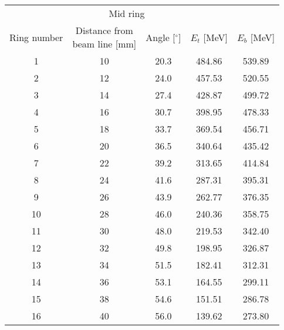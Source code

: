 \begin{tabular}{ccccc}
\hline
            & \multicolumn{2}{c}{Mid ring}                                     &             &             \\
Ring number & \shortstack{Distance from \\ beam line [mm]}  & Angle [$^\circ$] & $E_t$ [MeV] & $E_b$ [MeV] \\
\hline
1           & 10                                            & 20.3             & 484.86      & 539.89      \\
2           & 12                                            & 24.0             & 457.53      & 520.55      \\
3           & 14                                            & 27.4             & 428.87      & 499.72      \\
4           & 16                                            & 30.7             & 398.95      & 478.33      \\
5           & 18                                            & 33.7             & 369.54      & 456.71      \\
6           & 20                                            & 36.5             & 340.64      & 435.42      \\
7           & 22                                            & 39.2             & 313.65      & 414.84      \\
8           & 24                                            & 41.6             & 287.31      & 395.31      \\
9           & 26                                            & 43.9             & 262.77      & 376.35      \\
10          & 28                                            & 46.0             & 240.36      & 358.75      \\
11          & 30                                            & 48.0             & 219.53      & 342.40      \\
12          & 32                                            & 49.8             & 198.95      & 326.87      \\
13          & 34                                            & 51.5             & 182.41      & 312.31      \\
14          & 36                                            & 53.1             & 164.55      & 299.11      \\
15          & 38                                            & 54.6             & 151.51      & 286.78      \\
16          & 40                                            & 56.0             & 139.62      & 273.80      \\
\hline
\end{tabular}